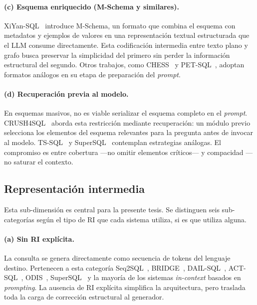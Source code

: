 \paragraph{(c) Esquema enriquecido (M-Schema y similares).}
XiYan-SQL~\cite{XiYan-SQL2024} introduce M-Schema, un formato que
combina el esquema con metadatos y ejemplos de valores en una
representación textual estructurada que el \ac{LLM} consume directamente.
Esta codificación intermedia entre texto plano y grafo busca preservar
la simplicidad del primero sin perder la información estructural del
segundo. Otros trabajos, como CHESS~\cite{CHESS2024} y
PET-SQL~\cite{PET-SQL2024}, adoptan formatos análogos en su etapa de
preparación del \emph{prompt}.

\paragraph{(d) Recuperación previa al modelo.} En esquemas masivos, no
es viable serializar el esquema completo en el \emph{prompt}.
CRUSH4SQL~\cite{CRUSH4SQL2023} aborda esta restricción mediante
recuperación: un módulo previo selecciona los elementos del esquema
relevantes para la pregunta antes de invocar al modelo.
TS-SQL~\cite{TS-SQL2025} y SuperSQL~\cite{SuperSQL2024} contemplan
estrategias análogas. El compromiso es entre cobertura ---no omitir
elementos críticos--- y compacidad ---no saturar el contexto.

\subsection{Representación intermedia}
\label{subsec:sota-d3b-ir}

Esta sub-dimensión es central para la presente tesis. Se distinguen seis
sub-categorías según el tipo de RI que cada sistema utiliza, si es que
utiliza alguna.

\paragraph{(a) Sin RI explícita.} La consulta se genera directamente como
secuencia de tokens del lenguaje destino. Pertenecen a esta categoría
Seq2SQL~\cite{Seq2SQL2017}, BRIDGE~\cite{BRIDGE2020},
DAIL-SQL~\cite{DAIL-SQL2023}, ACT-SQL~\cite{ACT-SQL2023},
ODIS~\cite{ODIS2023}, SuperSQL~\cite{SuperSQL2024} y la mayoría de los
sistemas \emph{in-context} basados en \emph{prompting}. La ausencia de
RI explícita simplifica la arquitectura, pero traslada toda la carga de
corrección estructural al generador.


